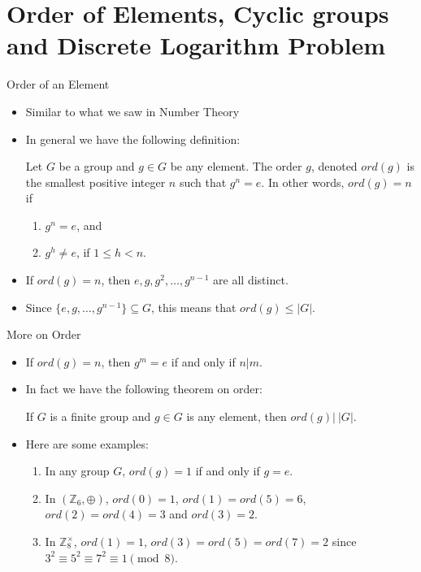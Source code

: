 \documentclass[ %
 10pt, xcolor={dvipsnames,svgnames,x11names,hyperref},
   hyperref={colorlinks=true,citecolor=green,linkcolor=DarkRed,urlcolor=ProcessBlue,anchorcolor=blue}
  ]{beamer}
\newenvironment{stepitemize}{\begin{itemize}[<+->]}{\end{itemize} }
\newcommand{\Z}{\mathbb{Z}}
\begin{document}
\section{Order of Elements, Cyclic groups and Discrete Logarithm Problem}
\begin{frame}{Order of an Element}
    \begin{stepitemize}
    \item Similar to what we saw in Number Theory
    \item In general we have the following definition:
    \begin{definition}
Let $G$ be a group and $g\in G$ be any element. The order $g$, denoted $ord(g)$ is the smallest positive integer $n$ such that $g^n=e$. In other words, $ord(g)=n$ if 
\begin{enumerate}
    \item $g^n=e$, and 
    \item $g^h\neq e$, if $1\leq h <n$.
\end{enumerate}
\end{definition}

\item[] \begin{lemma}\label{1}
If $ord(g) = n$, then $e, g, g^2, \dots, g^{n-1}$ are all distinct. 
\end{lemma}

\item[] \begin{corollary}
Since $\{e,g, \dots, g^{n-1}\} \subseteq G$, this means that $ord(g)\leq |G|.$
\end{corollary}
\end{stepitemize}
\end{frame}
\begin{frame}{More on Order}
\begin{stepitemize}
    \item[] \begin{lemma}
If $ord(g)=n$, then $g^m=e$ if and only if $n|m$. 
\end{lemma}
\item In fact we have the following theorem on order:
\begin{theorem}
If $G$ is a finite group and $g \in G$ is any element, then 
$ord(g)| \: |G|$.
\end{theorem}
\item Here are some examples:
\begin{enumerate}
    \item In any group $G$, $ord(g)=1$ if and only if $g=e$.
    \item In $(\Z_6,\oplus)$, $ord (0)=1$, $ord(1)=ord(5)=6$, $ord(2)=ord(4)=3$ and $ord(3)=2$. 
    \item In $\Z_{8}^{\times}$, $ord(1)=1$, $ord(3)=ord(5)=ord(7)=2$ since $3^2\equiv 5^2\equiv 7^2 \equiv 1 \pmod{8}$. 
\end{enumerate}
\end{stepitemize}
    
\end{frame}
\end{document}
